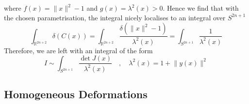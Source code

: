 \documentclass[a4paper,11pt]{article}
\theoremstyle{definition}
\newcommand{\RR}{\mathbb{R}}
\begin{document}
where $f(x) = \lVert x \rVert^2 - 1$ and  $g(x) = \lambda^2(x) > 0$.
Hence we find that with the chosen parametrisation, the integral nicely localises to an integral over $S^{2n + 1}$
\begin{equation}
  \int_{\RR^{2n + 2}} \delta(C(x)) = \int_{\RR^{2n+2}} \frac{\delta\left( \lVert x \rVert^2 - 1 \right)}{\lambda^2(x)} = \int_{S^{2n + 1}} \frac{1}{\lambda^2(x)}
\end{equation}
Therefore, we are left with an integral of the form 
\begin{equation}
  I \sim \int_{S^{2n + 1}} \frac{\det J(x)}{\lambda^2(x)} \quad , \quad \lambda^2(x) = 1 + \lVert y(x) \rVert^2
  \label{eq:toy_schema_I}
\end{equation}

\subsection{Homogeneous Deformations}
\end{document}

